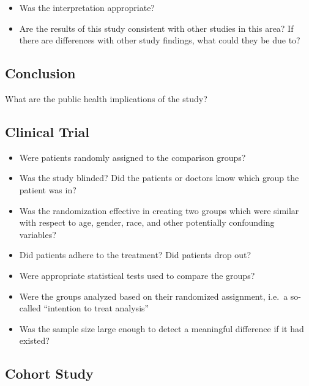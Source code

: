 \documentclass[
]{book}
\providecommand{\tightlist}{%
  \setlength{\itemsep}{0pt}\setlength{\parskip}{0pt}}
\begin{document}
\begin{itemize}
\tightlist
\item
  Was the interpretation appropriate?
\item
  Are the results of this study consistent with other studies in this area? If there are differences with other study findings, what could they be due to?
\end{itemize}

\hypertarget{conclusion}{%
\subsection{Conclusion}\label{conclusion}}

What are the public health implications of the study?

\hypertarget{clinical-trial}{%
\subsection{Clinical Trial}\label{clinical-trial}}

\begin{itemize}
\tightlist
\item
  Were patients randomly assigned to the comparison groups?
\item
  Was the study blinded? Did the patients or doctors know which group the patient was in?
\item
  Was the randomization effective in creating two groups which were similar with respect to age, gender, race, and other potentially confounding variables?
\item
  Did patients adhere to the treatment? Did patients drop out?
\item
  Were appropriate statistical tests used to compare the groups?
\item
  Were the groups analyzed based on their randomized assignment, i.e.~a so-called ``intention to treat analysis''
\item
  Was the sample size large enough to detect a meaningful difference if it had existed?
\end{itemize}

\hypertarget{cohort-study}{%
\subsection{Cohort Study}\label{cohort-study}}
\end{document}
